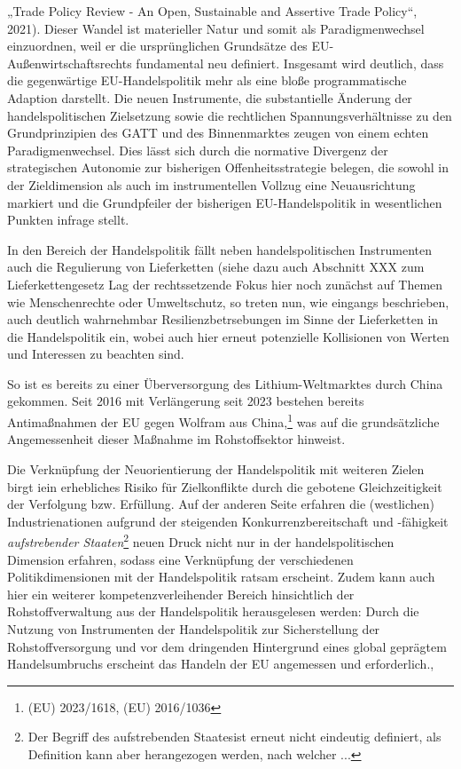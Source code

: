 \documentclass[12pt,a4paper,oneside]{book} %
\begin{document}
„Trade Policy Review - An Open, Sustainable and Assertive Trade Policy“, 2021). Dieser Wandel ist materieller Natur und somit als Paradigmenwechsel einzuordnen, weil er die ursprünglichen Grundsätze des EU-Außenwirtschaftsrechts fundamental neu definiert. Insgesamt wird deutlich, dass die gegenwärtige EU-Handelspolitik mehr als eine bloße programmatische Adaption darstellt. Die neuen Instrumente, die substantielle Änderung der handelspolitischen Zielsetzung sowie die rechtlichen Spannungsverhältnisse zu den Grundprinzipien des GATT und des Binnenmarktes zeugen von einem echten Paradigmenwechsel. Dies lässt sich durch die normative Divergenz der strategischen Autonomie zur bisherigen Offenheitsstrategie belegen, die sowohl in der Zieldimension als auch im instrumentellen Vollzug eine Neuausrichtung markiert und die Grundpfeiler der bisherigen EU-Handelspolitik in wesentlichen Punkten infrage stellt.
	
	In den Bereich der Handelspolitik fällt neben handelspolitischen Instrumenten auch die Regulierung von Lieferketten (siehe dazu auch Abschnitt XXX zum Lieferkettengesetz %
	Lag der rechtssetzende Fokus hier noch zunächst auf Themen wie Menschenrechte oder Umweltschutz, so treten nun, wie eingangs beschrieben, auch deutlich wahrnehmbar Resilienzbetrsebungen im Sinne der Lieferketten in die Handelspolitik ein, wobei auch hier erneut potenzielle Kollisionen von Werten und Interessen zu beachten sind.\autocite{Müller-Ibold/Herrmann, EuZW 2022, 1085, 1090} 
	
	So ist es bereits zu einer Überversorgung des Lithium-Weltmarktes durch China gekommen.\autocite{https://www.reuters.com/markets/commodities/china-is-oversupplying-lithium-eliminate-rivals-us-official-says-2024-10-08/}
	Seit 2016 mit Verlängerung seit 2023 bestehen bereits Antimaßnahmen der EU gegen Wolfram aus China,\footnote{ (EU) 2023/1618, (EU) 2016/1036} was auf die grundsätzliche Angemessenheit dieser Maßnahme im Rohstoffsektor hinweist.
	
	Die Verknüpfung der Neuorientierung der Handelspolitik mit weiteren Zielen birgt iein erhebliches Risiko für Zielkonflikte durch die gebotene Gleichzeitigkeit der Verfolgung bzw. Erfüllung.\autocite{Schäffer/Hach, ZRP 2023, 207, 208} Auf der anderen Seite erfahren die (westlichen) Industrienationen aufgrund der steigenden Konkurrenzbereitschaft und -fähigkeit \textit{aufstrebender Staaten}\footnote{Der Begriff des \glqq aufstrebenden Staates\grqq ist erneut nicht eindeutig definiert, als Definition kann aber \cite{CITATIONNEEDED} herangezogen werden, nach welcher ...} neuen Druck nicht nur in der handelspolitischen Dimension erfahren\autocite{Altemöller, EuZW 2019, 321, 322}, sodass eine Verknüpfung der verschiedenen Politikdimensionen mit der Handelspolitik ratsam erscheint. Zudem kann auch hier ein weiterer kompetenzverleihender Bereich hinsichtlich der Rohstoffverwaltung aus der Handelspolitik herausgelesen werden: Durch die Nutzung von Instrumenten der Handelspolitik zur Sicherstellung der Rohstoffversorgung und vor dem dringenden Hintergrund eines global geprägtem Handelsumbruchs erscheint das Handeln der EU angemessen und erforderlich.,
	
\end{document}
